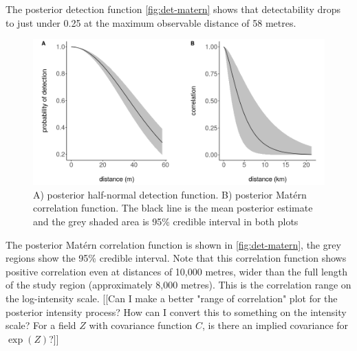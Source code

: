 \documentclass{stylefile16/statsoc}
\begin{document}
The posterior detection function \autoref{fig:det-matern} shows that detectability drops to just under 0.25 at the maximum observable distance of 58 metres.
\begin{figure}[h]
	\begin{center}
		\includegraphics[scale=0.525]{figures/detfn_and_matern.png}
		\caption{A) posterior half-normal detection function. B) posterior Mat\'ern correlation function.  The black line is the mean posterior estimate and the grey shaded area is 95\% credible interval in both plots}
		\label{fig:det-matern}
	\end{center}
\end{figure}
The posterior Mat\'ern correlation function is shown in \autoref{fig:det-matern}, the grey regions show the 95\% credible interval.  Note that this correlation function shows positive correlation even at distances of 10,000 metres, wider than the full length of the study region (approximately 8,000 metres).  This is the correlation range on the log-intensity scale.  [[Can I make a better "range of correlation" plot for the posterior intensity process?  How can I convert this to something on the intensity scale?  For a field $Z$ with covariance function $C$, is there an implied covariance for $\exp(Z)$?]]
\end{document}

